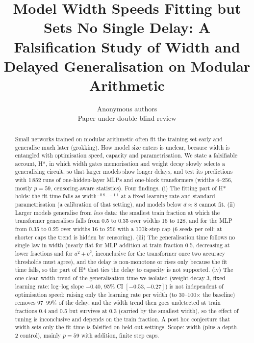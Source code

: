 \documentclass{article}
\title{Model Width Speeds Fitting but Sets No Single Delay: A Falsification Study of Width and Delayed Generalisation on Modular Arithmetic}
\author{Anonymous authors \\ Paper under double-blind review}
\begin{document}
\maketitle

\begin{abstract}
Small networks trained on modular arithmetic often fit the training set early and generalise much later (grokking). How model size enters is unclear, because width is entangled with optimisation speed, capacity and parametrisation. We state a falsifiable account, H*, in which width gates memorisation and weight decay slowly selects a generalising circuit, so that larger models show longer delays, and test its predictions with 1\,852 runs of one-hidden-layer MLPs and one-block transformers (widths 4--256, mostly $p=59$, censoring-aware statistics). Four findings. (i) The fitting part of H* holds: the fit time falls as width$^{-0.8\ldots-1.1}$ at a fixed learning rate and standard parametrisation (a calibration of that setting), and models below $d\approx8$ cannot fit. (ii) Larger models generalise from \emph{less} data: the smallest train fraction at which the transformer generalises falls from 0.5 to 0.35 over widths 16 to 128, and for the MLP from 0.35 to 0.25 over widths 16 to 256 with a 100k-step cap (6 seeds per cell; at shorter caps the trend is hidden by censoring). (iii) The generalisation time follows no single law in width (nearly flat for MLP addition at train fraction 0.5, decreasing at lower fractions and for $a^2+b^2$, inconclusive for the transformer once two accuracy thresholds must agree), and the delay is non-monotone or rises only because the fit time falls, so the part of H* that ties the delay to capacity is not supported. (iv) The one clean width trend of the generalisation time we isolated (weight decay 3, fixed learning rate: log--log slope $-0.40$, 95\% CI $[-0.53,-0.27]$) is not independent of optimisation speed: raising only the learning rate per width (to 30--100$\times$ the baseline) removes 97--99\% of the delay, and the width trend then goes undetected at train fractions 0.4 and 0.5 but survives at 0.3 (carried by the smallest width), so the effect of tuning is inconclusive and depends on the train fraction. A post hoc conjecture that width sets only the fit time is falsified on held-out settings. Scope: width (plus a depth-2 control), mainly $p=59$ with addition, finite step caps.
\end{abstract}
\end{document}
